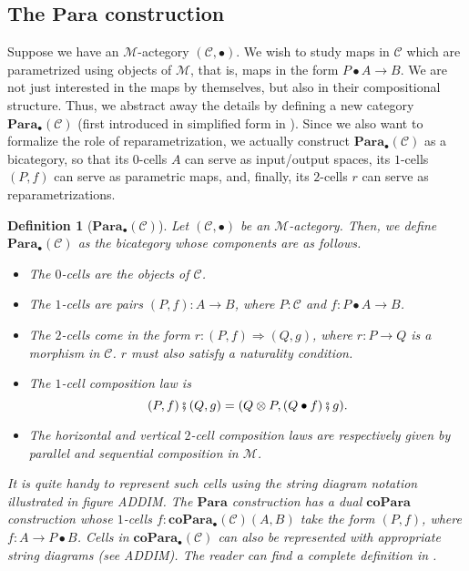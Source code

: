 \documentclass[11pt,a4paper,openright,twoside]{report}
\newcounter{mycounter}
\theoremstyle{plain}
\newtheorem{definition}[mycounter]{Definition}
\theoremstyle{definition}
\begin{document}
\subsection{The $\mathbf{Para}$ construction}


Suppose we have an $\mathcal{M}$-actegory $(\mathcal{C}, \bullet)$. We wish to study maps in $\mathcal{C}$ which are parametrized using objects of $\mathcal{M}$, that is, maps in the form $P \bullet A \to B$. We are not just interested in the maps by themselves, but also in their compositional structure. Thus, we abstract away the details by defining a new category $\mathbf{Para}_{\bullet}(\mathcal{C})$ (first introduced in simplified form in \cite{fong2019backprop}). Since we also want to formalize the role of reparametrization, we actually construct $\mathbf{Para}_{\bullet}(\mathcal{C})$ as a bicategory, so that its $0$-cells $A$ can serve as input/output spaces, its $1$-cells $(P,f)$ can serve as parametric maps, and, finally, its $2$-cells $r$ can serve as reparametrizations.

\begin{definition}[$\mathbf{Para}_{\bullet}(\mathcal{C})$]
  \label{def: para}
  Let $(\mathcal{C}, \bullet)$ be an $\mathcal{M}$-actegory. Then, we define $\mathbf{Para}_{\bullet}(\mathcal{C})$ as the bicategory whose components are as follows.
  \begin{itemize}
    \item The $0$-cells are the objects of $\mathcal{C}$.
    \item The $1$-cells are pairs $(P,f): A \to B$, where $P : \mathcal{C}$ and $f: P \bullet A \to B$.
    \item The $2$-cells come in the form $r: (P,f) \Rightarrow (Q,g)$, where $r: P \to Q$ is a morphism in $\mathcal{C}$. $r$ must also satisfy a naturality condition.
    \item The $1$-cell composition law is
    \[(P,f) \fatsemi (Q,g) = (Q \otimes P, (Q \bullet f)  \fatsemi g).\]
    \item The horizontal and vertical $2$-cell composition laws are respectively given by parallel and sequential composition in $\mathcal{M}$. 
  \end{itemize}
  It is quite handy to represent such cells using the string diagram notation illustrated in figure ADDIM. The $\mathbf{Para}$ construction has a dual $\mathbf{coPara}$ construction whose $1$-cells $f:\mathbf{coPara}_{\bullet}(\mathcal{C})(A,B)$ take the form $(P,f)$, where $f: A \to P \bullet B$. Cells in $\mathbf{coPara}_{\bullet}(\mathcal{C})$ can also be represented with appropriate string diagrams (see ADDIM). The reader can find a complete definition in \cite{gavranovic2024fundamental}.
\end{definition}
\end{document}
